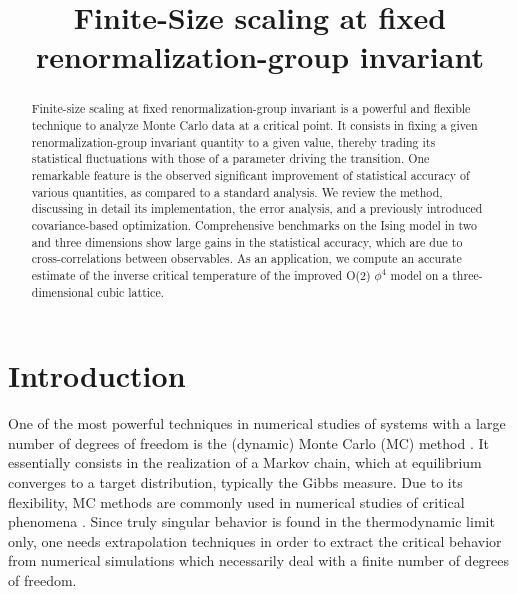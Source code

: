 \documentclass[pre,twocolumn]{revtex4-2}
\begin{document}
\title{Finite-Size scaling at fixed renormalization-group invariant}
\author{ }
\begin{abstract}
  Finite-size scaling at fixed renormalization-group invariant is a powerful and flexible technique to analyze Monte Carlo data at a critical point.
  It consists in fixing a given renormalization-group invariant quantity to a given value, thereby trading its statistical fluctuations with those of a parameter driving the transition.
  One remarkable feature is the observed significant improvement of statistical accuracy of various quantities, as compared to a standard analysis.
  We review the method, discussing in detail its implementation, the error analysis, and a previously introduced covariance-based optimization.
  Comprehensive benchmarks on the Ising model in two and three dimensions show large gains in the statistical accuracy, which are due to cross-correlations between observables.
  As an application, we compute an accurate estimate of the inverse critical temperature of the improved O(2) $\phi^4$ model on a three-dimensional cubic lattice.
\end{abstract}

\maketitle

\section{Introduction}
\label{sec:intro}
One of the most powerful techniques in numerical studies of systems with a large number of degrees of freedom is the (dynamic) Monte Carlo (MC) method \cite{Sokal_lecture}.
It essentially consists in the realization of a Markov chain, which at equilibrium converges to a target distribution, typically the Gibbs measure.
Due to its flexibility, MC methods are commonly used in numerical studies of critical phenomena \cite{PV-02}.
Since truly singular behavior is found in the thermodynamic limit only, one needs extrapolation techniques in order to extract the critical behavior from numerical simulations which necessarily deal with a finite number of degrees of freedom.
\end{document}
